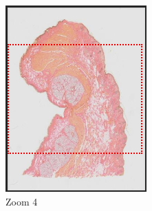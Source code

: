 \documentclass[a4paper,11pt]{report}
\numberwithin{figure}{chapter} %
\begin{document}
\begin{itemize}
\begin{figure}[H]
\begin{subfigure}[b]{0.3\textwidth}
            \includegraphics[width=\textwidth]{images/zooms2.png}
            \caption{Zoom 4}
            \end{subfigure}
            \begin{subfigure}[b]{0.3\textwidth}

\end{subfigure}
\end{figure}
\end{itemize}
\end{document}
